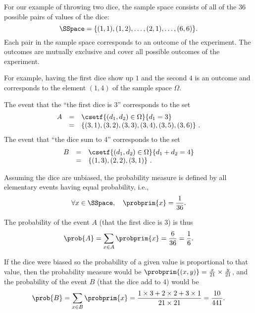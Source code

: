 


\begin{example}
\label{ex:probability::spaces::dice}

  For our example of throwing two dice, the sample space
  consists of all of the $36$ possible pairs of values of the dice:
\[
\SSpace = \{(1,1),(1,2),\ldots,(2,1),\ldots,(6,6)\}.
\]
%
Each pair in the sample space corresponds to an outcome of the experiment.
%
The outcomes are mutually exclusive and cover all possible outcomes of
the experiment.


For example, having the first dice show up $1$ and the second $4$ is
an outcome and corresponds to  the element $(1,4)$ of the sample space $\Omega$.

The event that the ``the first dice is 3'' corresponds to the
set
\[
\begin{array}{lcl}
  A & = & \csetf{(d_1,d_2) \in \Omega}{d_1 = 3} \\
  & = &  \{(3,1),(3,2),(3,3),(3,4),(3,5),(3,6)\}~.
\end{array}
\]
The event that ``the dice sum to 4'' corresponds to the set
\[
\begin{array}{lcl}
  B & = & \csetf{(d_1,d_2) \in \Omega}{d_1 + d_2 = 4}\\
  & = & \{(1,3),(2,2),(3,1)\}~.
\end{array}
\]

Assuming the dice are unbiased, 
the probability measure is defined by all elementary
events having equal probability, i.e.,
\[
\forall x \in \SSpace,~~~\probprim{x} = \frac{1}{36}.
\]

The probability of the event $A$ (that the first dice
is 3) is thus 
\[
\prob{A} = \sum_{x \in A} \probprim{x} = \frac{6}{36} = \frac{1}{6}. 
\]

If the dice were biased so the probability of a given value is
proportional to that value, then the
probability measure would be
$\probprim{(x,y)} = \frac{x}{21} \times \frac{y}{21}$, and the probability
of the event $B$ (that the dice add to 4) would be
\[
\prob{B} = \sum_{x \in B} \probprim{x} = \frac{1 \times 3 + 2 \times 2
  + 3 \times 1}{21 \times 21} = \frac{10}{441}. 
\]


\end{example}


